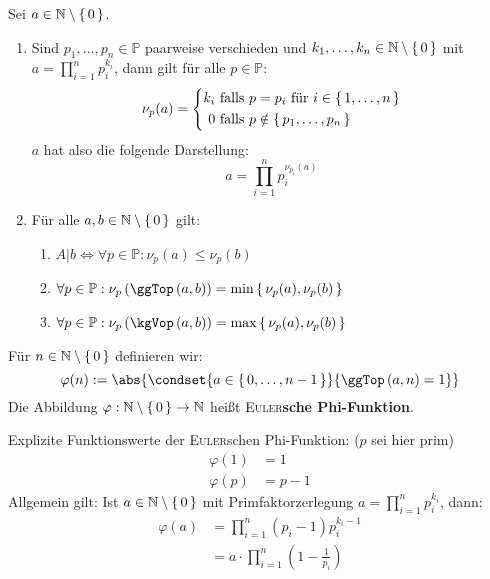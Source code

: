 \documentclass{../../meta/tudscript}
\begin{document}
Sei $a \in \mathbb{N} \setminus \set{0}$. \\
\begin{enumerate}
	\item Sind $p_1, \ldots, p_n \in \mathbb{P}$ paarweise verschieden und $k_1, \ldots, k_n \in \mathbb{N} \setminus \set{0}$ mit $a = \prod_{i=1}^n p_i^{k_i}$, dann gilt für alle $p \in \mathbb{P}$:
	      \begin{equation*}
	      \nu_p (a) = \left\lbrace \begin{aligned} k_i & \text{ falls } p=p_i \text{ für } i \in \set{1, \ldots, n} \\ 0 & \text{ falls } p \notin \set{p_1,\ldots,p_n} \end{aligned} \right.
	      \end{equation*}
	      $a$ hat also die folgende Darstellung:
	      \begin{equation*}
	      a = \prod_{i=1}^n p_i^{\nu_{p_i}(a)}
	      \end{equation*}
	\item Für alle $a,b \in \mathbb{N} \setminus \set{0}$ gilt:
	      \begin{enumerate}
		\item $A \vert b \Leftrightarrow \forall p \in \mathbb{P}: \nu_p (a) \leqslant \nu_p (b)$
		\item $\forall p \in \mathbb{P}: \nu_p \left( \ggTop \left( a,b \right) \right) = \min \set{\nu_p (a), \nu_p (b)}$
		\item $\forall p \in \mathbb{P}: \nu_p \left( \kgVop \left( a,b \right) \right) = \max \set{\nu_p (a), \nu_p (b)}$
	      \end{enumerate}
\end{enumerate}
Für $n \in \mathbb{N} \setminus \set{0}$ definieren wir:
\begin{equation*}
\varphi (n) := \abs{\condset{a \in \set{0, \ldots, n-1}}{\ggTop \left( a,n \right) = 1}}
\end{equation*}
Die Abbildung $\varphi: \mathbb{N} \setminus \set{0} \rightarrow \mathbb{N}$ heißt \textsc{Euler}\textbf{sche Phi-Funktion}.


Explizite Funktionswerte der \textsc{Euler}schen Phi-Funktion: ($p$ sei hier prim)
\begin{align*}
\varphi (1) & = 1 \\
\varphi (p) & = p-1
\end{align*}
Allgemein gilt: Ist $a \in \mathbb{N} \setminus \set{0}$ mit Primfaktorzerlegung $a = \prod_{i=1}^n p_i^{k_i}$, dann:
\begin{align*}
\varphi (a) & = \prod_{i=1}^n \left( p_i - 1 \right) p_i^{k_i -1} \\ & = a \cdot \prod_{i=1}^n \left( 1 - \frac{1}{p_i} \right)
\end{align*}
\end{document}
